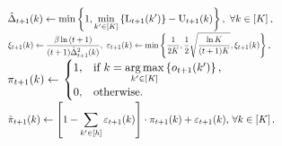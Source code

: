 \begin{algorithm}[t]
\begin{algorithmic}
		\STATE $\scalemath{0.8}{ \hat{\Delta}_{t+1}(k) \gets \min\left\{ 1,  \min\limits_{k^\prime \in \left[K\right]}\left\{ \lcb_{t+1}(k^\prime) \right\}  - \ucb_{t+1}(k)\right\}, \ \forall k \in [K] }  $.
		\STATE $\scalemath{0.65}{ \xi_{t+1}(k) \gets \frac{\beta \ln{(t+1)}}{(t+1) \hat{\Delta}_{t+1}^2(k)}, \ \varepsilon_{t+1}(k) \gets \min\left\{ \frac{1}{2 K}, \frac{1}{2} \sqrt{\frac{\ln{K}}{(t+1) K}},  \xi_{t+1}(k) \right\} }$.
		\STATE $\scalemath{0.9}{ \pi_{t+1}(k) \gets \left. 
		    \begin{cases}
		    1, & \text{if } k = \argmax\limits_{k^\prime \in \left[K\right]}\left\{ o_{t+1}(k^\prime)\right\}, \\
		    0, & \text{otherwise}.
		    \end{cases}
		    \right. }$
		\STATE $\scalemath{0.8}{ \tilde{\pi}_{t+1}(k) \gets \left[ 1 - \sum\limits_{k^\prime \in [h]}{\varepsilon_{t+1}(k)} \right] \cdot  \pi_{t+1}(k) + \varepsilon_{t+1}(k)$, $\forall k \in [K] }$.
		
		\ENDFOR
	\end{algorithmic}
\end{algorithm}



